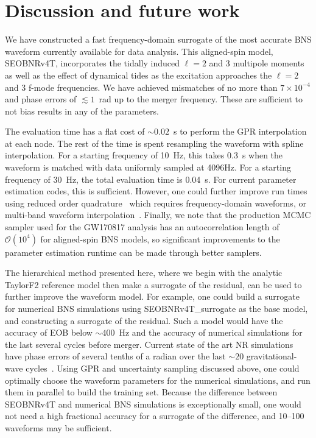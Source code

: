 \documentclass[prd,aps,letter,twocolumn,floatfix,notitlepage,nofootinbib]{revtex4-1}
\begin{document}
\section{Discussion and future work}

We have constructed a fast frequency-domain surrogate of the most accurate BNS waveform currently available for data analysis. This aligned-spin model, SEOBNRv4T, incorporates the tidally induced $\ell=2$ and 3 multipole moments as well as the effect of dynamical tides as the excitation approaches the $\ell=2$ and 3 f-mode frequencies. We have achieved mismatches of no more than $7 \times 10^{-4}$ and phase errors of $\lesssim 1$~rad up to the merger frequency. These are sufficient to not bias results in any of the parameters.

The evaluation time has a flat cost of $\sim 0.02$~s to perform the GPR interpolation at each node. The rest of the time is spent resampling the waveform with spline interpolation. For a starting frequency of 10~Hz, this takes 0.3~s when the waveform is matched with data uniformly sampled at 4096Hz. For a starting frequency of 30~Hz, the total evaluation time is 0.04~s. For current parameter estimation codes, this is sufficient. However, one could further improve run times using reduced order quadrature~\cite{Antil2013, CanizaresFieldGair2013, CanizaresFieldGair2015} which requires frequency-domain waveforms, or multi-band waveform interpolation~\cite{VinciguerraVeitchMandel2017}. Finally, we note that the production MCMC sampler used for the GW170817 analysis has an autocorrelation length of $\mathcal{O}(10^4)$ for aligned-spin BNS models, so significant improvements to the parameter estimation runtime can be made through better samplers. 

The hierarchical method presented here, where we begin with the analytic TaylorF2 reference model then make a surrogate of the residual, can be used to further improve the waveform model. For example, one could build a surrogate for numerical BNS simulations using SEOBNRv4T\_surrogate as the base model, and constructing a surrogate of the residual. Such a model would have the accuracy of EOB below $\sim 400$~Hz and the accuracy of numerical simulations for the last several cycles before merger. Current state of the art NR simulations have phase errors of several tenths of a radian over the last $\sim 20$ gravitational-wave cycles~\cite{DietrichHinderer2017, KiuchiKawaguchiKyutoku2017}. Using GPR and uncertainty sampling discussed above, one could optimally choose the waveform parameters for the numerical simulations, and run them in parallel to build the training set. Because the difference between SEOBNRv4T and numerical BNS simulations is exceptionally small, one would not need a high fractional accuracy for a surrogate of the difference, and 10--100 waveforms may be sufficient.
\end{document}
